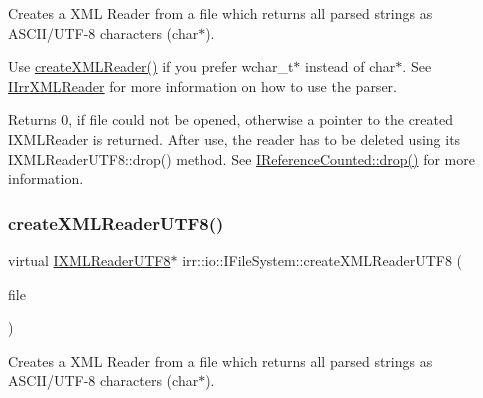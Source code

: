 Creates a X\+ML Reader from a file which returns all parsed strings as A\+S\+C\+I\+I/\+U\+T\+F-\/8 characters (char$\ast$). 

Use \hyperlink{classirr_1_1io_1_1IFileSystem_a167c9fa159d16ee5c56c074636b0865e}{create\+X\+M\+L\+Reader()} if you prefer wchar\+\_\+t$\ast$ instead of char$\ast$. See \hyperlink{classirr_1_1io_1_1IIrrXMLReader}{I\+Irr\+X\+M\+L\+Reader} for more information on how to use the parser. \begin{DoxyReturn}{Returns}
0, if file could not be opened, otherwise a pointer to the created I\+X\+M\+L\+Reader is returned. After use, the reader has to be deleted using its I\+X\+M\+L\+Reader\+U\+T\+F8\+::drop() method. See \hyperlink{classirr_1_1IReferenceCounted_a03856a09355b89d178090c4a5f738543}{I\+Reference\+Counted\+::drop()} for more information. 
\end{DoxyReturn}
\mbox{\label{classirr_1_1io_1_1IFileSystem_acda42a761d3b2fb4d39ad1d9e2ada973}} 
\subsubsection{\texorpdfstring{create\+X\+M\+L\+Reader\+U\+T\+F8()}{createXMLReaderUTF8()}\hspace{0.1cm}{\footnotesize\ttfamily [3/4]}}
{\footnotesize\ttfamily virtual \hyperlink{namespaceirr_1_1io_a87616ca0bcc3d6424d2c2edfcb743193}{I\+X\+M\+L\+Reader\+U\+T\+F8}$\ast$ irr\+::io\+::\+I\+File\+System\+::create\+X\+M\+L\+Reader\+U\+T\+F8 (\begin{DoxyParamCaption}\item[{\hyperlink{classirr_1_1io_1_1IReadFile}{I\+Read\+File} $\ast$}]{file }\end{DoxyParamCaption})\hspace{0.3cm}{\ttfamily [pure virtual]}}



Creates a X\+ML Reader from a file which returns all parsed strings as A\+S\+C\+I\+I/\+U\+T\+F-\/8 characters (char$\ast$). 

